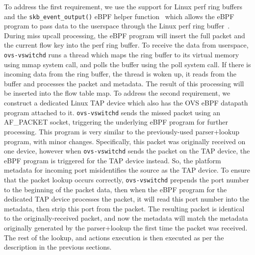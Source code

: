 \documentclass[10pt,numbers,reprint]{sigplanconf}
\begin{document}
To address the first requirement, we use the support for Linux perf ring
buffers and the \verb+skb_event_output()+ eBPF helper function~\cite{ebpfperf}
which allows the eBPF program to pass data to the userspace through the Linux perf
ring buffer~\cite{ebpfperf}.  During miss upcall processing, the eBPF program
will insert the full packet and the current flow key into the perf ring buffer.
To receive the data from userspace, \verb+ovs-vswitchd+ runs a thread which
maps the ring buffer to its virtual memory using mmap system call, and polls
the buffer using the poll system call. If there is incoming data from the ring buffer, the
thread is woken up, it reads from the buffer and processes the packet and
metadata. The result of this processing will be inserted into the flow table
map.
To address the second requirement, we construct a dedicated Linux TAP device
which also has the OVS eBPF datapath program attached to it.
\verb+ovs-vswitchd+ sends the missed packet using an AF\_PACKET socket,
triggering the underlying eBPF program for further processing.
This program is very similar to the
previously-used parser+lookup program, with minor changes. Specifically, this
packet was originally received on one device, however when \verb+ovs-vswitchd+
sends the packet on the TAP device, the eBPF program is triggered for the TAP
device instead. So, the platform metadata for incoming port misidentifies the
source as the TAP device. To ensure that the packet lookup occurs correctly,
\verb+ovs-vswitchd+ prepends the port number to the beginning of the packet
data, then when the eBPF program for the dedicated TAP device processes the
packet, it will read this port number into the metadata, then strip this port
from the packet. The resulting packet is identical to the originally-received
packet, and now the metadata will match the metadata originally generated by
the parser+lookup the first time the packet was received. The rest of the
lookup, and actions execution is then executed as per the description
in the previous sections.
\end{document}
